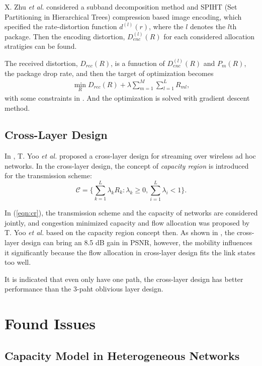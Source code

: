 \documentclass{IEEEtran}
\begin{document}
X. Zhu \textit{et al.} considered a subband decomposition method and SPIHT (Set Partitioning in Hierarchical Trees) compression based image encoding, which specified the rate-distortion function $d^{(l)}(r)$, where the $l$ denotes the $l$th package. Then the encoding distortion, $D^{(l)}_{enc}(R)$ for each considered allocation stratigies can be found. 

The received distortion, $D_{rec}(R)$, is a funuction of $D^{(l)}_{enc}(R)$ and $P_m(R)$, the package drop rate, and then the target of optimization becomes
\begin{eqnarray}
	\min_R D_{rec}(R)+\lambda\sum_{m=1}^{M}\sum_{l=1}^{L}R_{ml},
	\label{equ:distort_rate}
\end{eqnarray}
with some constraints in \cite{bib:zhu_icip2004}. And the optimization is solved with gradient descent method.

\subsection{Cross-Layer Design}
In \cite{bib:yoo_mmsp2004}, T. Yoo \textit{et al.} proposed a cross-layer design for streaming over wireless ad hoc networks. In the cross-layer design, the concept of \emph{capacity region} is introduced for the transmission scheme:
\begin{equation}
	\mathcal{C}=\Biggl\{\sum_{k=1}^{L}\lambda_kR_k : \lambda_k\ge0, \sum_{i=1}^L\lambda_i<1 \Biggr\}.
	\label{eqn:cr}
\end{equation}

In (\ref{eqn:cr}), the transmission scheme and the capacity of networks are considered jointly, and congestion minimized capacity and flow allocation was proposed by T. Yoo \textit{et al.} based on the capacity region concept then. As shown in \cite{bib:yoo_mmsp2004}, the cross-layer design can bring an 8.5 dB gain in PSNR, however, the mobility influences it significantly because the flow allocation in cross-layer design fits the link states too well.

It is indicated that even only have one path, the cross-layer design has better performance than the 3-paht oblivious layer design.

\section{Found Issues}\label{sec:issue}

\subsection{Capacity Model in Heterogeneous Networks}
\end{document}

